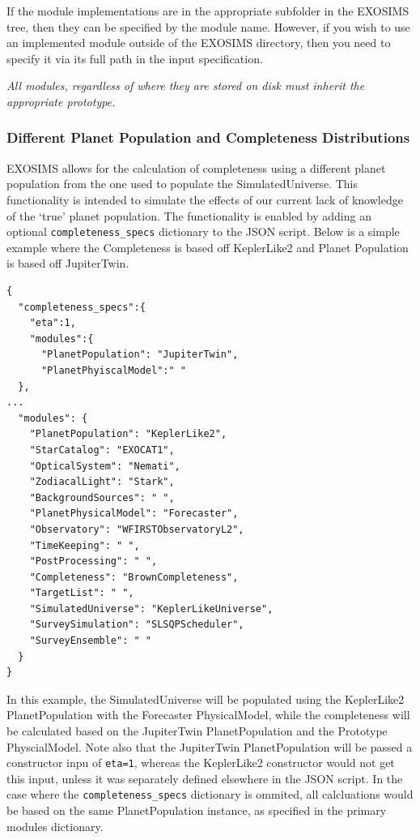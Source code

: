 \documentclass[cleanfoot]{asme2ej}
\begin{document}
If the module implementations are in the appropriate subfolder in the EXOSIMS tree, then they can be specified by the module name.  However, if you wish to use an implemented module outside of the EXOSIMS directory, then you need to specify it via its full path in the input specification.

\emph{All modules, regardless of where they are stored on disk must inherit the appropriate prototype.}

\subsubsection{Different Planet Population and Completeness Distributions}
EXOSIMS allows for the calculation of completeness using a different planet population from the one used to populate the SimulatedUniverse. This functionality is intended to simulate the effects of our current lack of knowledge of the `true' planet population. The functionality is enabled by adding an optional \verb+completeness_specs+ dictionary to the JSON script. Below is a simple example where the Completeness is based off KeplerLike2 and Planet Population is based off JupiterTwin.

\begin{verbatim}
{
  "completeness_specs":{
    "eta":1,
    "modules":{
      "PlanetPopulation": "JupiterTwin",
      "PlanetPhyiscalModel":" "
  },
...
  "modules": {
    "PlanetPopulation": "KeplerLike2",
    "StarCatalog": "EXOCAT1",
    "OpticalSystem": "Nemati",
    "ZodiacalLight": "Stark",
    "BackgroundSources": " ",
    "PlanetPhysicalModel": "Forecaster",
    "Observatory": "WFIRSTObservatoryL2",
    "TimeKeeping": " ",
    "PostProcessing": " ",
    "Completeness": "BrownCompleteness",
    "TargetList": " ",
    "SimulatedUniverse": "KeplerLikeUniverse",
    "SurveySimulation": "SLSQPScheduler",
    "SurveyEnsemble": " "
  }
}
\end{verbatim}

In this example, the SimulatedUniverse will be populated using the KeplerLike2 PlanetPopulation with the Forecaster PhysicalModel, while the completeness will be calculated based on the JupiterTwin PlanetPopulation and the Prototype PhyscialModel.  Note also that the JupiterTwin PlanetPopulation will be passed a constructor inpu of \verb+eta=1+, whereas the KeplerLike2 constructor would not get this input, unless it was separately defined elsewhere in the JSON script.  In the case where the \verb+completeness_specs+ dictionary is ommited, all calcluations would be based on the same PlanetPopulation instance, as specified in the primary modules dictionary.
\end{document}
